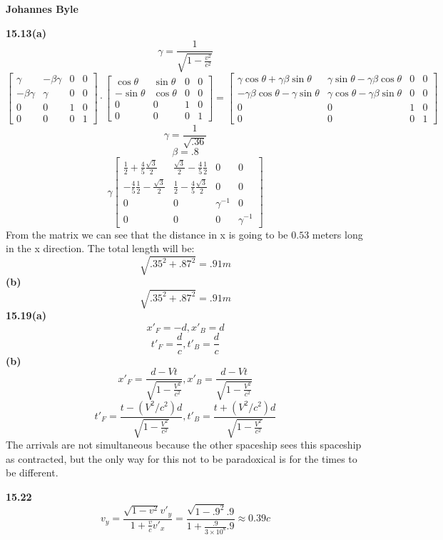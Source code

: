 \documentclass[english]{article}
\begin{document}
\begin{multicols*}{2}
\textbf{Johannes Byle}\\
\newcommand{\Lagr}{\mathcal{L}}

\noindent
\textbf{15.13(a)}\\
$$\gamma=\frac{1}{\sqrt{1-\frac{v^2}{c^2}}}$$
$$
\begin{bmatrix}
	\gamma & -\beta\gamma & 0 & 0\\
	-\beta\gamma & \gamma & 0 & 0\\
	0 & 0 & 1 & 0\\
	0 & 0 & 0 & 1
\end{bmatrix}
\cdot
\begin{bmatrix}
	\cos\theta & \sin\theta & 0 & 0\\
	-\sin\theta & \cos\theta & 0 & 0\\
	0 & 0 & 1 & 0\\
	0 & 0 & 0 & 1
\end{bmatrix}
=
\begin{bmatrix}
	\gamma\cos\theta+\gamma\beta\sin\theta & \gamma\sin\theta-\gamma\beta\cos\theta & 0 & 0\\
	-\gamma\beta\cos\theta-\gamma\sin\theta & \gamma\cos\theta-\gamma\beta\sin\theta & 0 & 0\\
	0 & 0 & 1 & 0\\
	0 & 0 & 0 & 1
\end{bmatrix}
$$
$$\gamma=\frac{1}{\sqrt{.36}}$$
$$\beta=.8$$
$$
\gamma
\begin{bmatrix}
	\frac{1}{2}+\frac{4}{5}\frac{\sqrt{3}}{2} & \frac{\sqrt{3}}{2}-\frac{4}{5}\frac{1}{2} & 0 & 0\\
	-\frac{4}{5}\frac{1}{2}-\frac{\sqrt{3}}{2} & \frac{1}{2}-\frac{4}{5}\frac{\sqrt{3}}{2} & 0 & 0\\
	0 & 0 & \gamma^{-1} & 0\\
	0 & 0 & 0 & \gamma^{-1}
\end{bmatrix}
$$
From the matrix we can see that the distance in x is going to be $0.53$ meters long in the x direction. The total length will be:
$$\sqrt{.35^2+.87^2}=.91m$$
\textbf{(b)}\\
$$\sqrt{.35^2+.87^2}=.91m$$
\noindent
\textbf{15.19(a)}\\
$$x'_F=-d,x'_B=d$$
$$t'_F=\frac{d}{c},t'_B=\frac{d}{c}$$
\textbf{(b)}\\
$$x'_F=\frac{d-Vt}{\sqrt{1-\frac{V^2}{c^2}}},x'_B=\frac{d-Vt}{\sqrt{1-\frac{V^2}{c^2}}}$$
$$t'_F=\frac{t-(V^2/c^2)d}{\sqrt{1-\frac{V^2}{c^2}}},t'_B=\frac{t+(V^2/c^2)d}{\sqrt{1-\frac{V^2}{c^2}}}$$
The arrivals are not simultaneous because the other spaceship sees this spaceship as contracted, but the only way for this not to be paradoxical is for the times to be different.


\bigskip
\bigskip
\bigskip
\bigskip
\bigskip
\bigskip
\bigskip
\bigskip
\bigskip
\noindent
\textbf{15.22}\\
$$v_y=\frac{\sqrt{1-v^2} v'_y}{1+\frac{v}{c}v'_x}=\frac{\sqrt{1-.9^2} .9}{1+\frac{.9}{3\times10^8}.9}\approx0.39c$$
\end{multicols*}
\end{document}
